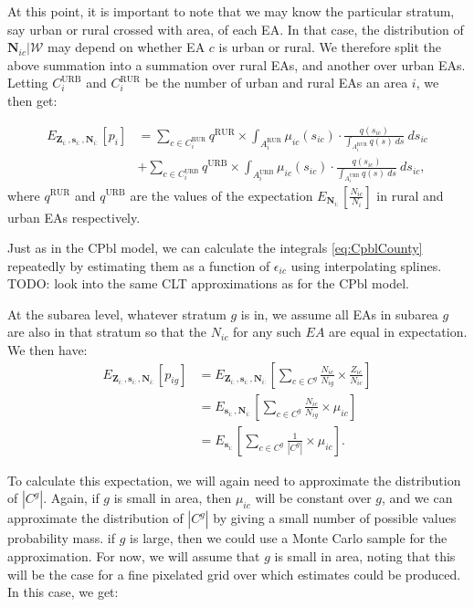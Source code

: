 \documentclass[12pt]{article}
\begin{document}
At this point, it is important to note that we may know the particular stratum, say urban or rural crossed with area, of each EA.  In that case, the distribution of $\boldsymbol{N}_{ic} \vert \mathscr{W}$ may depend on whether EA $c$ is urban or rural. We therefore split the above summation into a summation over rural EAs, and another over urban EAs. Letting $C_i^{\mathrm{URB}}$ and $C_i^{\mathrm{RUR}}$ be the number of urban and rural EAs an area $i$, we then get: 

\begin{align}
E_{\boldsymbol{Z}_{i:}, \boldsymbol{s}_{i:}, \boldsymbol{N}_{i:}} \left [p_i \right ] &= \sum_{c \in C_i^{\mathrm{RUR}}} q^{\mathrm{RUR}} \times \int_{A_i^{\mathrm{RUR}}} \mu_{ic}(s_{ic}) \cdot \frac{q(s_{ic})}{\int_{A_i^{\mathrm{RUR}}} q(s) \ ds} \ ds_{ic} \nonumber \\
&+ \sum_{c \in C_i^{\mathrm{URB}}} q^{\mathrm{URB}} \times \int_{A_i^{\mathrm{URB}}} \mu_{ic}(s_{ic}) \cdot \frac{q(s_{ic})}{\int_{A_i^{\mathrm{URB}}} q(s) \ ds} \ ds_{ic}, \label{eq:CpblCounty}
\end{align}
where $q^{\mathrm{RUR}}$ and $q^{\mathrm{URB}}$ are the values of the expectation $E_{\boldsymbol{N}_{i:}} \left [ \frac{N_{ic}}{N_i} \right ]$ in rural and urban EAs respectively.

Just as in the CPbl model, we can calculate the integrals \eqref{eq:CpblCounty} repeatedly by estimating them as a function of $ \epsilon_{ic}$ using interpolating splines. TODO: look into the same CLT approximations as for the CPbl model.

At the subarea level, whatever stratum $g$ is in, we assume all EAs in subarea $g$ are also in that stratum so that the $N_{ic}$ for any such $EA$ are equal in expectation.  We then have: 
\begin{align*}
E_{\boldsymbol{Z}_{i:}, \boldsymbol{s}_{i:}, \boldsymbol{N}_{i:}} \left [p_{ig} \right ] &= E_{\boldsymbol{Z}_{i:}, \boldsymbol{s}_{i:}, \boldsymbol{N}_{i:}} \left [ \sum_{c \in C^g} \frac{N_{ic}}{N_{ig}}  \times \frac{Z_{ic}}{N_{ic}} \right ] \\
&= E_{\boldsymbol{s}_{i:}, \boldsymbol{N}_{i:}} \left [ \sum_{c \in C^g} \frac{N_{ic}}{N_{ig}}  \times  \mu_{ic} \right ] \\
&= E_{\boldsymbol{s}_{i:}} \left [ \sum_{c \in C^g} \frac{1}{|C^g|}  \times  \mu_{ic} \right ].
\end{align*}

To calculate this expectation, we will again need to approximate the distribution of $|C^g|$. Again, if $g$ is small in area, then $\mu_{ic}$ will be constant over $g$, and we can approximate the distribution of $|C^g|$ by giving a small number of possible values probability mass. if $g$ is large, then we could use a Monte Carlo sample for the approximation. For now, we will assume that $g$ is small in area, noting that this will be the case for a fine pixelated grid over which estimates could be produced. In this case, we get: 
 
\end{document}
